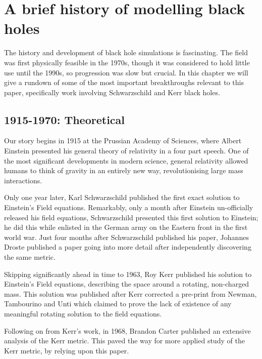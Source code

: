 \documentclass[oneside,openright,frontopenright, singlespacing]{dmathesis}
\begin{document}
\chapter{A brief history of modelling black holes}\label{chap:Chapter1}

	The history and development of black hole simulations is fascinating. The field was first physically feasible in the 1970s, though it was considered to hold little use until the 1990s, so progression was slow but crucial. In this chapter we will give a rundown of some of the most important breakthroughs relevant to this paper, specifically work involving Schwarzschild and Kerr black holes.

\section{1915-1970: Theoretical}\label{sec:Section1.1}

	Our story begins in 1915 at the Prussian Academy of Sciences, where Albert Einstein presented his general theory of relativity\cite{einstein1915feldgleichungen} in a four part speech. One of the most significant developments in modern science, general relativity allowed humans to think of gravity in an entirely new way, revolutionising large mass interactions.

\vspace{1em}
	Only one year later, Karl Schwarzschild published the first exact solution to Einstein's Field equations\cite{schwarzschild1916gravitationsfeld}. Remarkably, only a month after Einstein un-officially released his field equations, Schwarzschild presented this first solution to Einstein; he did this while enlisted in the German army on the Eastern front in the first world war. Just four months after Schwarzschild published his paper, Johannes Droste published a paper going into more detail after independently discovering the same metric\cite{droste1917field}.

\vspace{1em}
	Skipping significantly ahead in time to 1963, Roy Kerr published his solution to Einstein's Field equations, describing the space around a rotating, non-charged mass\cite{kerr1963gravitational}. This solution was published after Kerr corrected a pre-print from Newman, Tambourino and Unti which claimed to prove the lack of existence of any meaningful rotating solution to the field equations\cite{newman1963empty}.

\vspace{1em}
	Following on from Kerr's work, in 1968, Brandon Carter published an extensive analysis of the Kerr metric\cite{carter1968global}. This paved the way for more applied study of the Kerr metric, by relying upon this paper.
\end{document}
